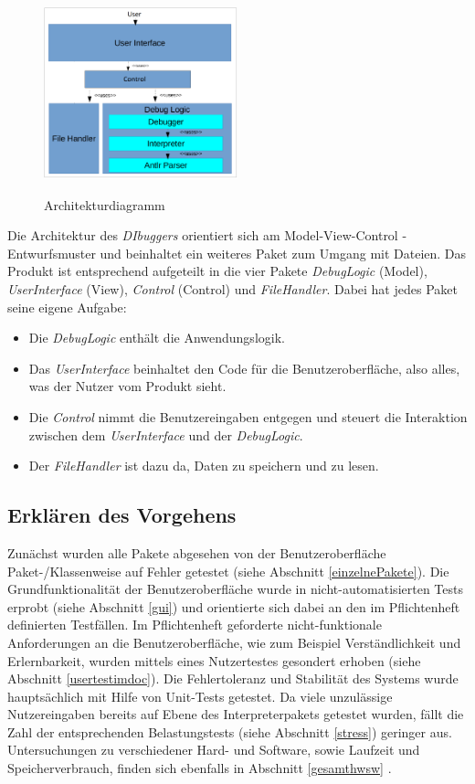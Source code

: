 \documentclass[parskip=full]{scrartcl}
\begin{document}
\begin{figure}[!h]
\centering
\includegraphics[width=0.5\textwidth]{../Plichtenheft/Architektur.png} \\
\caption{Architekturdiagramm}
\label{Architekturdiagramm}
\end{figure}
Die Architektur des \textit{DIbuggers} orientiert sich am Model-View-Control
-Entwurfsmuster und beinhaltet ein weiteres Paket zum Umgang mit Dateien. Das Produkt ist entsprechend aufgeteilt in die vier Pakete \textit{DebugLogic} (Model), \textit{UserInterface} (View),  \textit{Control} (Control) und \textit{FileHandler}. 
Dabei hat jedes Paket seine eigene Aufgabe:
\begin{itemize}
\item Die \textit{DebugLogic} enthält die Anwendungslogik.
\item Das \textit{UserInterface} beinhaltet den Code für die Benutzeroberfläche, also alles, was der Nutzer vom Produkt sieht.
\item Die \textit{Control} nimmt die Benutzereingaben entgegen und steuert die Interaktion zwischen dem \textit{UserInterface} und der \textit{DebugLogic}.
\item Der \textit{FileHandler} ist dazu da, Daten zu speichern und zu lesen.
\end{itemize}


\subsection{Erklären des Vorgehens}
Zunächst wurden alle Pakete abgesehen von der Benutzeroberfläche Paket-/Klassenweise auf Fehler getestet (siehe Abschnitt \ref{einzelnePakete}).
Die Grundfunktionalität der Benutzeroberfläche wurde in nicht-automatisierten Tests erprobt (siehe Abschnitt \ref{gui}) und orientierte sich dabei an den im Pflichtenheft definierten Testfällen. Im Pflichtenheft geforderte nicht-funktionale Anforderungen an die Benutzeroberfläche, wie zum Beispiel Verständlichkeit und Erlernbarkeit, wurden mittels eines Nutzertestes gesondert erhoben (siehe Abschnitt \ref{usertestimdoc}).
Die Fehlertoleranz und Stabilität des Systems wurde hauptsächlich mit Hilfe von Unit-Tests getestet. Da viele unzulässige Nutzereingaben bereits auf Ebene des Interpreterpakets getestet wurden, fällt die Zahl der entsprechenden Belastungstests (siehe Abschnitt \ref{stress}) geringer aus. Untersuchungen zu verschiedener Hard- und Software, sowie Laufzeit und Speicherverbrauch, finden sich ebenfalls in Abschnitt \ref{gesamthwsw} .
\end{document}
